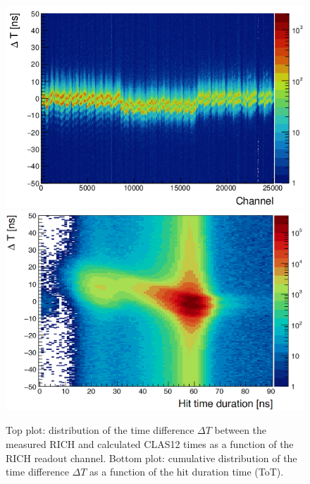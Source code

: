 \documentclass[5p,times,twocolumn]{elsarticle}
\begin{document}
\begin{figure}[t]
\begin{center}
\includegraphics[width=1.0\columnwidth]{dt_vs_anode_nocor.png}
\includegraphics[width=1.0\columnwidth]{dt_vs_dur_nocor.png}
\end{center}
\caption{Top plot: distribution of the time difference $\Delta T$ between the measured RICH and calculated CLAS12
  times as a function of the RICH readout channel. Bottom plot: cumulative distribution of the time difference
  $\Delta T$ as a function of the hit duration time (ToT).}
\label{fig:Time_uncorr}
\end{figure}
\end{document}
